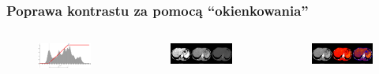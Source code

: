 \documentclass[aspectratio=169]{beamer}
\begin{document}
\begin{frame}[t]

    \frametitle{Poprawa kontrastu za pomocą \enquote{okienkowania}}

    \vspace{-1em}

    \begin{columns}[t]
        \vspace{-2.0em}
        \begin{figure}
            \includegraphics[width=1\textwidth]{img/windowing-chart2.png}
        \end{figure}
        \vspace{-1.0em}
        \begin{figure}
            \includegraphics[trim={0 1cm 0 2cm},clip,width=1\textwidth]{img/monochrome-002.png}
        \end{figure}
        \vspace{-2.0em}
        \begin{figure}
            \includegraphics[trim={0 1cm 0 2cm},clip,width=1\textwidth]{img/monochrome-003.png}
        \end{figure}


\end{columns}
\end{frame}
\end{document}
